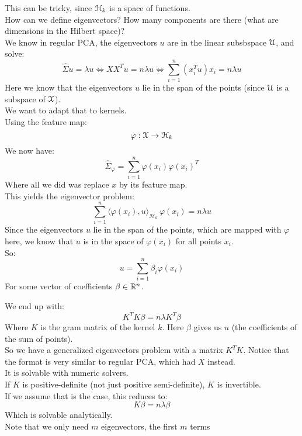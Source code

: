 \documentclass[12pt]{article}
\begin{document}
This can be tricky, since $\mathcal{H}_k$
is a space of functions. \\
How can we define eigenvectors? How many
components are there (what are dimensions in the
Hilbert space)? \\

We know in regular PCA, the eigenvectors $u$
are in the linear subsbspace $\mathcal{U}$, and solve:
\[  \hat{\Sigma} u = \lambda u \iff
XX^T u = n \lambda u \iff
\sum_{i = 1}^n (x_i^Tu)x_i = n \lambda u \]
Here we know that the eigenvectors $u$ lie in the
span of the points (since $\mathcal{U}$ is a subspace 
of $\mathcal{X}$). \\ 
We want to adapt that to kernels. \\

Using the feature map:
\[ \varphi: \mathcal{X} \to \mathcal{H}_k \]
We now have:
\[ \hat{\Sigma}_\varphi =  \sum_{i = 1}^n \varphi(x_i)
\varphi(x_i)^T \]
Where all we did was replace $x$ by its feature map. \\
This yields the eigenvector problem:
\[ \sum_{i=1}^n \langle \varphi(x_i), 
u \rangle_{\mathcal{H}_k} \, \varphi(x_i) = n\lambda u \]
Since the eigenvectors $u$ lie in the
span of the points, which are mapped with
$\varphi$ here, we know that $u$ is in the space of 
$\varphi(x_i)$ for all points $x_i$. \\
So:
\[ u = \sum_{i = 1}^n \beta_i\varphi(x_i) \]
For some vector of coefficients $\beta \in \mathbb{R}^n$. \\


We end up with:
\[ K^TK \beta = n \lambda K^T \beta \]
Where $K$ is the gram matrix of the kernel $k$.
Here $\beta$ gives us $u$
(the coefficients of the sum of points). \\

So we have a generalized eigenvectors problem
with a matrix $K^TK$.
Notice that the format is very similar to 
regular PCA, which had $X$ instead. \\
It is solvable with numeric solvers. \\

If $K$ is positive-definite (not just positive 
semi-definite), $K$ is invertible. \\
If we assume that is the case, this reduces to:
\[ K \beta = n\lambda \beta \]
Which is solvable analytically. \\
Note that we only need $m$ eigenvectors, the
first $m$ terms
\end{document}

